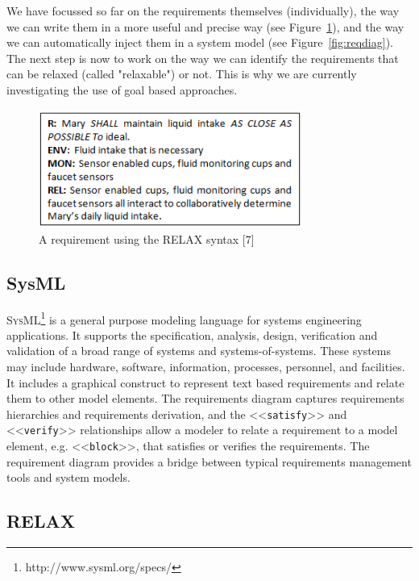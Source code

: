 \documentclass[10pt, conference, compsocconf]{IEEEtran}
\def\sysml{\textsc{SysML}}
\newcommand{\Myfig}[1]{Figure~\ref{fig:#1}}
\newcommand{\stereotype}[1]{\textless\textless\texttt{#1}\textgreater\textgreater}
\begin{document}
We have focussed so far on the requirements themselves (individually), the way we can write them in a more useful and precise way (see \Myfig{relaxreq}), and the way we can automatically inject them in a system model (see \Myfig{reqdiag}).
The next step is now to work on the way we can identify the requirements that can be relaxed (called "relaxable") or not.
This is why we are currently investigating the use of goal based approaches.

\begin{figure}[!t]
\centering
\includegraphics[width=3.4in]{fig15}
\caption{A requirement using the RELAX syntax [7]}
\label{fig:relaxreq}
\end{figure}

\subsection{SysML}


\sysml{}\footnote{http://www.sysml.org/specs/} is a general purpose modeling language for systems engineering applications. It supports the specification, analysis, design, verification and validation of a broad range of systems and systems-of-systems. These systems may include hardware, software, information, processes, personnel, and facilities. It includes a graphical construct to represent text based requirements and relate them to other model elements. The requirements diagram captures requirements hierarchies and requirements derivation, and the \stereotype{satisfy} and \stereotype{verify} relationships allow a modeler to relate a requirement to a model element, e.g. \stereotype{block}, that satisfies or verifies the requirements. The requirement diagram provides a bridge between typical requirements management tools and system models.

\subsection{RELAX}
\end{document}
